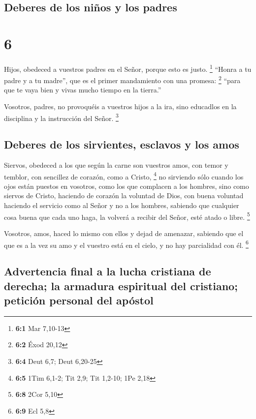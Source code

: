 \hypertarget{deberes-de-los-niuxf1os-y-los-padres}{%
\subsection{Deberes de los niños y los
padres}\label{deberes-de-los-niuxf1os-y-los-padres}}

\hypertarget{section-5}{%
\section{6}\label{section-5}}

 Hijos, obedeced a vuestros padres en el Señor, porque
esto es justo. \footnote{\textbf{6:1} Mar 7,10-13} 
``Honra a tu padre y a tu madre'', que es el primer mandamiento con una
promesa: \footnote{\textbf{6:2} Éxod 20,12}  ``para que te
vaya bien y vivas mucho tiempo en la tierra.''

 Vosotros, padres, no provoquéis a vuestros hijos a la
ira, sino educadlos en la disciplina y la instrucción del Señor.
\footnote{\textbf{6:4} Deut 6,7; Deut 6,20-25}

\hypertarget{deberes-de-los-sirvientes-esclavos-y-los-amos}{%
\subsection{Deberes de los sirvientes, esclavos y los
amos}\label{deberes-de-los-sirvientes-esclavos-y-los-amos}}

 Siervos, obedeced a los que según la carne son vuestros
amos, con temor y temblor, con sencillez de corazón, como a Cristo,
\footnote{\textbf{6:5} 1Tim 6,1-2; Tit 2,9; Tit 1,2-10; 1Pe 2,18}
 no sirviendo sólo cuando los ojos están puestos en
vosotros, como los que complacen a los hombres, sino como siervos de
Cristo, haciendo de corazón la voluntad de Dios,  con
buena voluntad haciendo el servicio como al Señor y no a los hombres,
 sabiendo que cualquier cosa buena que cada uno haga, la
volverá a recibir del Señor, esté atado o libre. \footnote{\textbf{6:8}
  2Cor 5,10}

 Vosotros, amos, haced lo mismo con ellos y dejad de
amenazar, sabiendo que el que es a la vez su amo y el vuestro está en el
cielo, y no hay parcialidad con él. \footnote{\textbf{6:9} Ecl 5,8}

\hypertarget{advertencia-final-a-la-lucha-cristiana-de-derecha-la-armadura-espiritual-del-cristiano-peticiuxf3n-personal-del-apuxf3stol}{%
\subsection{Advertencia final a la lucha cristiana de derecha; la
armadura espiritual del cristiano; petición personal del
apóstol}\label{advertencia-final-a-la-lucha-cristiana-de-derecha-la-armadura-espiritual-del-cristiano-peticiuxf3n-personal-del-apuxf3stol}}

